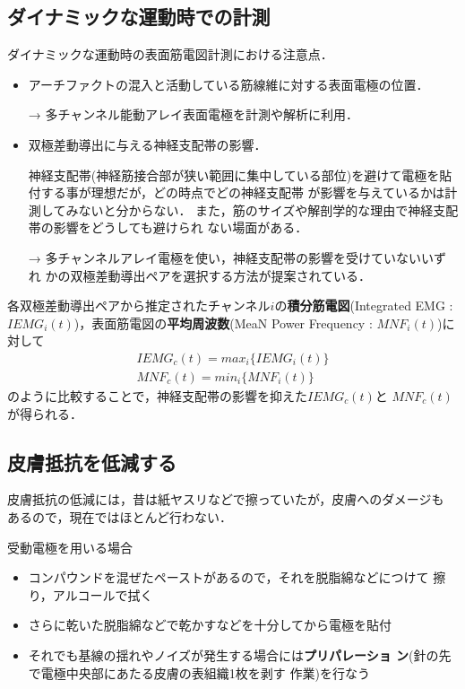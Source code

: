 \documentclass[10pt,twocolumn]{jarticle}
\begin{document}
\subsection{ダイナミックな運動時での計測}
ダイナミックな運動時の表面筋電図計測における注意点．
\begin{itemize}
\item アーチファクトの混入と活動している筋線維に対する表面電極の位置．

→ 多チャンネル能動アレイ表面電極を計測や解析に利用．
\item 双極差動導出に与える神経支配帯の影響．

神経支配帯(神経筋接合部が狭い範囲に集中している部位)を避けて電極を貼付する事が理想だが，どの時点でどの神経支配帯
が影響を与えているかは計測してみないと分からない．
また，筋のサイズや解剖学的な理由で神経支配帯の影響をどうしても避けられ
ない場面がある．

→ 多チャンネルアレイ電極を使い，神経支配帯の影響を受けていないいずれ
かの双極差動導出ペアを選択する方法が提案されている．
\end{itemize}

各双極差動導出ペアから推定されたチャンネル$i$の{\bf 積分筋電図}(Integrated
EMG : $IEMG_i(t)$)，表面筋電図の{\bf 平均周波数}(MeaN Power Frequency :
$MNF_i(t)$)に対して
\begin{align}
  IEMG_c(t)=max_i\{IEMG_i(t)\} \\
  MNF_c(t)=min_i\{MNF_i(t)\}
\end{align}
のように比較することで，神経支配帯の影響を抑えた$IEMG_c(t)$と
$MNF_c(t)$が得られる．


\subsection{皮膚抵抗を低減する}
皮膚抵抗の低減には，昔は紙ヤスリなどで擦っていたが，皮膚へのダメージも
あるので，現在ではほとんど行わない．

{\footnotesize
受動電極を用いる場合
\begin{itemize}
\item コンパウンドを混ぜたペーストがあるので，それを脱脂綿などにつけて
  擦り，アルコールで拭く
\item さらに乾いた脱脂綿などで乾かすなどを十分してから電極を貼付
\item それでも基線の揺れやノイズが発生する場合には{\bf プリパレーショ
    ン}(針の先で電極中央部にあたる皮膚の表組織1枚を剥す
作業)を行なう
\end{itemize}
}
\end{document}
